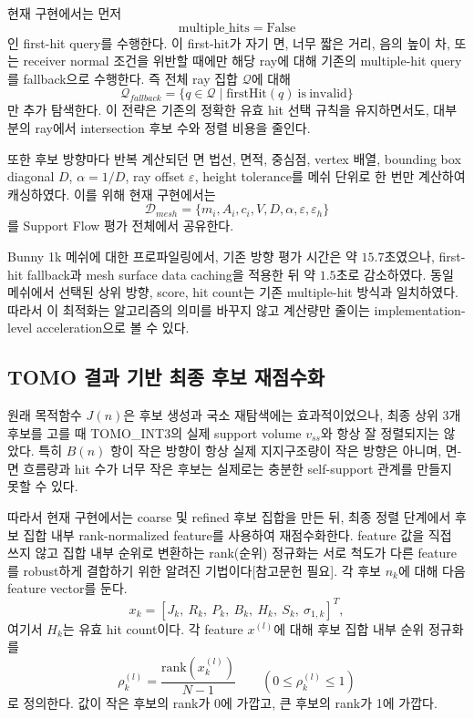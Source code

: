 \documentclass[11pt,a4paper]{article}
\begin{document}
현재 구현에서는 먼저
\begin{equation}
\mathrm{multiple\_hits}=\mathrm{False}
\end{equation}
인 first-hit query를 수행한다.
이 first-hit가 자기 면, 너무 짧은 거리, 음의 높이 차, 또는 receiver normal 조건을 위반할 때에만
해당 ray에 대해 기존의 multiple-hit query를 fallback으로 수행한다.
즉 전체 ray 집합 $\mathcal{Q}$에 대해
\begin{equation}
\mathcal{Q}_{fallback}
=
\{q\in\mathcal{Q}\mid \mathrm{firstHit}(q)\ \mathrm{is\ invalid}\}
\end{equation}
만 추가 탐색한다.
이 전략은 기존의 정확한 유효 hit 선택 규칙을 유지하면서도,
대부분의 ray에서 intersection 후보 수와 정렬 비용을 줄인다.

또한 후보 방향마다 반복 계산되던 면 법선, 면적, 중심점, vertex 배열,
bounding box diagonal $D$, $\alpha=1/D$, ray offset $\varepsilon$, height tolerance를
메쉬 단위로 한 번만 계산하여 캐싱하였다.
이를 위해 현재 구현에서는
\begin{equation}
\mathcal{D}_{mesh}
=
\{m_i,A_i,c_i,V,D,\alpha,\varepsilon,\varepsilon_h\}
\end{equation}
를 Support Flow 평가 전체에서 공유한다.

Bunny 1k 메쉬에 대한 프로파일링에서,
기존 방향 평가 시간은 약 $15.7$초였으나,
first-hit fallback과 mesh surface data caching을 적용한 뒤 약 $1.5$초로 감소하였다.
동일 메쉬에서 선택된 상위 방향, score, hit count는 기존 multiple-hit 방식과 일치하였다.
따라서 이 최적화는 알고리즘의 의미를 바꾸지 않고 계산량만 줄이는 implementation-level acceleration으로 볼 수 있다.

\subsection{TOMO 결과 기반 최종 후보 재점수화}

원래 목적함수 $J(n)$은 후보 생성과 국소 재탐색에는 효과적이었으나,
최종 상위 3개 후보를 고를 때 TOMO\_INT3의 실제 support volume $v_{ss}$와 항상 잘 정렬되지는 않았다.
특히 $B(n)$ 항이 작은 방향이 항상 실제 지지구조량이 작은 방향은 아니며,
면-면 흐름량과 hit 수가 너무 작은 후보는 실제로는 충분한 self-support 관계를 만들지 못할 수 있다.

따라서 현재 구현에서는 coarse 및 refined 후보 집합을 만든 뒤,
최종 정렬 단계에서 후보 집합 내부 rank-normalized feature를 사용하여 재점수화한다.
feature 값을 직접 쓰지 않고 집합 내부 순위로 변환하는 rank(순위) 정규화는
서로 척도가 다른 feature를 robust하게 결합하기 위한 알려진 기법이다[참고문헌 필요].
각 후보 $n_k$에 대해 다음 feature vector를 둔다.
\begin{equation}
x_k
=
\left[
J_k,\ R_k,\ P_k,\ B_k,\ H_k,\ S_k,\ \sigma_{1,k}
\right]^T ,
\end{equation}
여기서 $H_k$는 유효 hit count이다.
각 feature $x^{(l)}$에 대해 후보 집합 내부 순위 정규화를
\begin{equation}
\rho^{(l)}_k
=
\frac{\mathrm{rank}(x^{(l)}_k)}{N-1}
\qquad
\left(0\le \rho^{(l)}_k\le 1\right)
\end{equation}
로 정의한다.
값이 작은 후보의 rank가 0에 가깝고, 큰 후보의 rank가 1에 가깝다.
\end{document}
